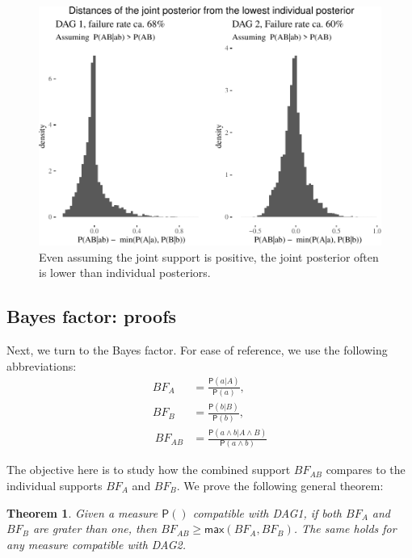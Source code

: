 \documentclass[
  10pt,
  dvipsnames,enabledeprecatedfontcommands]{scrartcl}
\newcommand{\pr}[1]{\ensuremath{\mathsf{P}(#1)}}
\newtheorem{theorem}{Theorem}
\begin{document}
\begin{figure}[H]


\begin{center}\includegraphics[width=0.75\linewidth]{conjunction-appendix14_files/figure-latex/unnamed-chunk-11-1} \end{center}
\caption{Even assuming the joint support is positive, the joint posterior often is lower than individual posteriors.}
\label{fig:posteriorFailure}
\end{figure}

\hypertarget{bayes-factor-proofs}{%
\subsection*{Bayes factor: proofs}\label{bayes-factor-proofs}}

Next, we turn to the Bayes factor. For ease of reference, we use the
following abbreviations: \begin{align*}
BF_A  & =  \frac{\pr{a \vert A}}{\pr{a}},\\
BF_B & = \frac{\pr{b \vert B}}{\pr{b}},\\\
BF_{AB}  & =  \frac{\pr{a\wedge b \vert A \wedge B}}{\pr{a \wedge b}}
\end{align*}

\noindent The objective here is to study how the combined support
\(BF_{AB}\) compares to the individual supports \(BF_A\) and \(BF_B\).
We prove the following general theorem:

\begin{theorem}
Given a measure $\pr{}$ compatible with \textsf{DAG1}, if both $BF_A$ and $BF_B$ 
are grater than one, then $BF_{AB}\geq \mathsf{max}(BF_{A},BF_{B})$.
The same holds for any measure compatible with \textsf{DAG2}.
\label{thm:aggregationBf}
\end{theorem}
\end{document}
